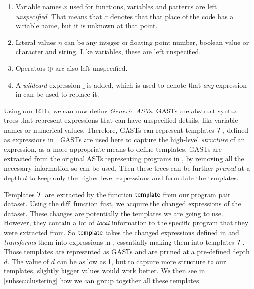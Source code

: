 \begin{enumerate}
    \item Variable names $x$ used for functions, variables and patterns are left
    \emph{unspecified}. That means that $x$ denotes that that place of the code
    has a variable name, but it is unknown at that point.
    \item Literal values $n$ can be any integer or floating point number,
    boolean value or character and string. Like variables, these are left
    unspecified.
    \item Operators $\oplus$ are also left unspecified.
    \item A \emph{wildcard} expression $\_$ is added, which is used to denote
    that \emph{any} expression in \repairLang can be used to replace it.
\end{enumerate}

Using our RTL, we can now define \emph{Generic ASTs}. GASTs are abstract syntax
trees that represent expressions that can have unspecified details, like
variable names or numerical values. Therefore, GASTs can represent templates
$\mathcal{T}$, defined as expressions in \repairLang. GASTs are used here to capture the
high-level \emph{structure} of an expression, as a more appropriate means to
define templates. GASTs are extracted from the original ASTs representing
programs in \lang, by removing all the necessary information so \repairLang can
be used. Then these trees can be further \emph{pruned} at a depth $d$ to keep
only the higher level expressions and formulate the templates.


Templates $\mathcal{T}$ are extracted by the function $\mathsf{template}$ from our program
pair dataset. Using the $\mathsf{diff}$ function first, we acquire the changed
expressions of the dataset. These changes are potentially the templates we are
going to use. However, they contain a lot of \emph{local} information to the
specific program that they were extracted from. So $\mathsf{template}$ takes the
changed expressions defined in \lang and \emph{transforms} them into expressions
in \repairLang, essentially making them into templates $\mathcal{T}$. Those templates are
represented as GASTs and are pruned at a pre-defined depth $d$. The value of $d$
can be as low as 1, but to capture more structure to our templates, slightly
bigger values would work better. We then see in \autoref{subsec:clustering} how
we can group together all these templates.

